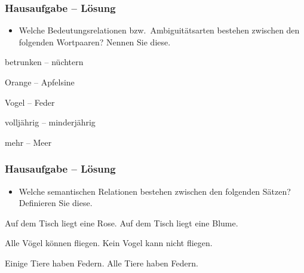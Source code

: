 \begin{frame}
\frametitle{Hausaufgabe -- Lösung}

\begin{itemize}
\item Welche Bedeutungsrelationen bzw.\ Ambiguitätsarten bestehen zwischen den folgenden Wortpaaren? Nennen Sie diese.
\end{itemize}

\ea 
	\ea betrunken -- nüchtern \pause 
	\hfill {}
	
	\ex Orange -- Apfelsine \pause 
	\hfill {}
	
	\ex Vogel -- Feder \pause 
	\hfill {}
	
	
	\ex volljährig -- minderjährig \pause 
	\hfill {}
	
	\ex mehr -- Meer \pause 
	\hfill {}
	\z 
\z 

\end{frame}


\begin{frame}
\frametitle{Hausaufgabe -- Lösung}

\begin{itemize}
	\item Welche semantischen Relationen bestehen zwischen den folgenden Sätzen? Definieren Sie diese.
\end{itemize}

\ea 
\ea Auf dem Tisch liegt eine Rose.
\ex Auf dem Tisch liegt eine Blume.

\pause 

\hfill {}
\z 

\pause 

\ex 	
\ea Alle Vögel können fliegen.
\ex Kein Vogel kann nicht fliegen.

\pause 

\hfill {}
\z 

\pause 

\ex 	
\ea Einige Tiere haben Federn.
\ex Alle Tiere haben Federn.

\pause 

\hfill {}
\z 	
\z 

\end{frame}

